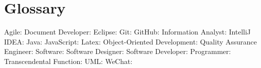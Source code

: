 \documentclass[12pt]{article}
\begin{document}
\newpage
\section{Glossary}
Agile: \newline
Document Developer: \newline
Eclipse: \newline
Git: \newline
GitHub: \newline
Information Analyst: \newline
IntelliJ IDEA: \newline
Java: \newline
JavaScript: \newline
Latex: \newline
Object-Oriented Development: \newline
Quality Assurance Engineer: \newline
Software: \newline
Software Designer: \newline
Software Developer: \newline
Programmer: \newline
Transcendental Function: \newline
UML: \newline
WeChat: \newline



\end{document}
